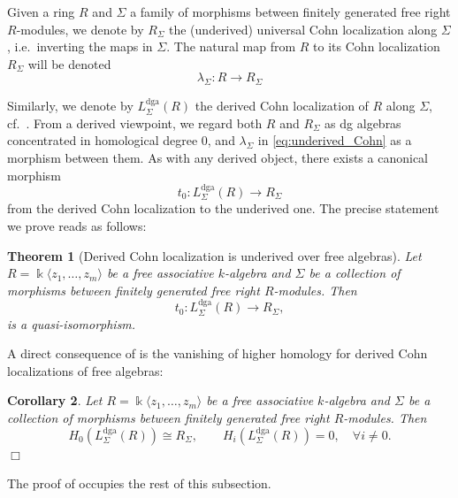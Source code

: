\documentclass[11pt]{article}
\newtheorem{theorem}{Theorem}[section]
\newtheorem{corollary}[theorem]{Corollary}
\newcommand{\kk}{\Bbbk}
\begin{document}
\noindent Given a ring $R$ and $\Sigma$ a family of morphisms between finitely generated free right
\(R\)-modules, we denote by $R_\Sigma$ the (underived) universal Cohn localization along $\Sigma$, i.e.~inverting the maps in
\(\Sigma\). The natural map from $R$ to its Cohn localization $R_\Sigma$ will be denoted
\begin{equation}\label{eq:underived_Cohn}
\lambda_\Sigma:R\longrightarrow R_\Sigma
\end{equation}

\noindent Similarly, we denote by $L^{\mathrm{dga}}_\Sigma(R)$ the derived Cohn localization of $R$ along $\Sigma$, cf.~\cite[Definition 4.35]{BCL}. From a derived viewpoint, we regard both $R$ and $R_\Sigma$ as dg algebras concentrated in
homological degree \(0\), and $\lambda_\Sigma$ in \eqref{eq:underived_Cohn} as a morphism between them. As with any derived object, there exists a canonical morphism
\begin{equation}\label{eq:truncation_localizations}
t_0:L^{\mathrm{dga}}_\Sigma(R)\longrightarrow R_\Sigma
\end{equation}
from the derived Cohn localization to the underived one. The precise statement we prove reads as follows:

\begin{theorem}[Derived Cohn localization is underived over free algebras]\label{prop:ordinary-equals-derived-localization}
Let $R=\kk\langle z_1,\ldots,z_m\rangle$ be a free associative \(k\)-algebra and $\Sigma$ be a collection of morphisms between finitely generated free right \(R\)-modules. Then
\[
t_0:L^{\mathrm{dga}}_\Sigma(R)\longrightarrow R_\Sigma,
\]
is a quasi-isomorphism.
\end{theorem}

\noindent A direct consequence of  is the vanishing of higher homology for derived Cohn localizations of free algebras:

\begin{corollary}
\label{cor:ordinary-equals-derived-localization2}
Let $R=\kk\langle z_1,\ldots,z_m\rangle$ be a free associative \(k\)-algebra and $\Sigma$ be a collection of morphisms between finitely generated free right \(R\)-modules. Then
\[
H_0\!\left(L^{\mathrm{dga}}_\Sigma(R)\right)\cong R_\Sigma,\qquad H_i\!\left(L^{\mathrm{dga}}_\Sigma(R)\right)=0,\quad \forall i\neq 0.
\]
\hfill$\Box$
\end{corollary}

\noindent The proof of  occupies the rest of this subsection.
\end{document}
